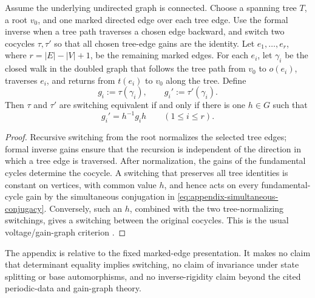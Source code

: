 \begin{proposition}
\label{prop:fundamental-cycle-certificate}
Assume the underlying undirected graph is connected.  Choose a spanning tree
\(T\), a root \(v_0\), and one marked directed edge over each tree edge.
Use the formal inverse when a tree path traverses a chosen edge backward, and
switch two cocycles \(\tau,\tau'\) so that all chosen tree-edge gains are the
identity.  Let \(e_1,\ldots,e_r\), where \(r=|E|-|V|+1\), be the remaining
marked edges.  For each \(e_i\), let \(\gamma_i\) be the closed walk in the
doubled graph that follows the tree path from \(v_0\) to \(o(e_i)\), traverses
\(e_i\), and returns from \(t(e_i)\) to \(v_0\) along the tree.  Define
\[
 g_i:=\tau(\gamma_i),\qquad g_i':=\tau'(\gamma_i).
\]
Then \(\tau\) and \(\tau'\) are switching equivalent if and only if there is
one \(h\in G\) such that
\begin{equation}\label{eq:appendix-simultaneous-conjugacy}
 g_i'=h^{-1}g_i h\qquad(1\le i\le r).
\end{equation}
\end{proposition}

\begin{proof}
Recursive switching from the root normalizes the selected tree edges; formal
inverse gains ensure that the recursion is independent of the direction in
which a tree edge is traversed.  After normalization, the gains of the
fundamental cycles determine the cocycle.  A switching that preserves all
tree identities is constant on vertices, with common value \(h\), and hence
acts on every fundamental-cycle gain by the simultaneous conjugation in
\eqref{eq:appendix-simultaneous-conjugacy}.  Conversely, such an \(h\),
combined with the two tree-normalizing switchings, gives a switching between
the original cocycles.  This is the usual voltage/gain-graph criterion
\cite{GrossTucker1987TopologicalGraphTheory,
CavaleriDAngeliDonno2021BalanceGainGraphs}.
\end{proof}

The appendix is relative to the fixed marked-edge presentation.  It makes no
claim that determinant equality implies switching, no claim of invariance
under state splitting or base automorphisms, and no inverse-rigidity claim
beyond the cited periodic-data and gain-graph theory.
